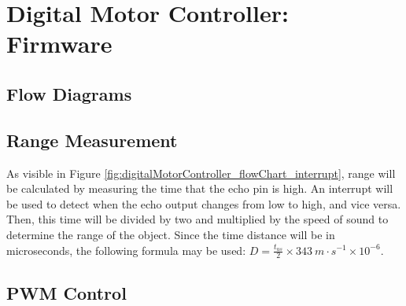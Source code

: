 \graphicspath{{content/2_design/figures/}}
\section{Digital Motor Controller: Firmware}

\subsection{Flow Diagrams}

\begin{figure}[!htb]
    \centering
    \begin{minipage}{.45\textwidth}
        \centering
        \label{fig:digitalMotorController_flowChart_setup}
    \end{minipage}
    \begin{minipage}{.45\textwidth}
        \centering
        \label{fig:digitalMotorController_flowChart_interrupt}
    \end{minipage}
    \begin{minipage}{.45\textwidth}
        \centering
        \label{fig:digitalMotorController_flowChart_loop}
    \end{minipage}
\end{figure}

\subsection{Range Measurement}

As visible in Figure \ref{fig:digitalMotorController_flowChart_interrupt}, range will be calculated by measuring the time that the echo pin is high. An interrupt will be used to detect when
the echo output changes from low to high, and vice versa. Then, this time will be divided by two and multiplied by the speed of sound to determine
the range of the object. Since the time distance will be in microseconds, the following formula may be used: $D = \frac{t_{us}}{2} \times \SI{343}{m \cdot s^{-1}} \times 10^{-6}$.

\subsection{PWM Control}

